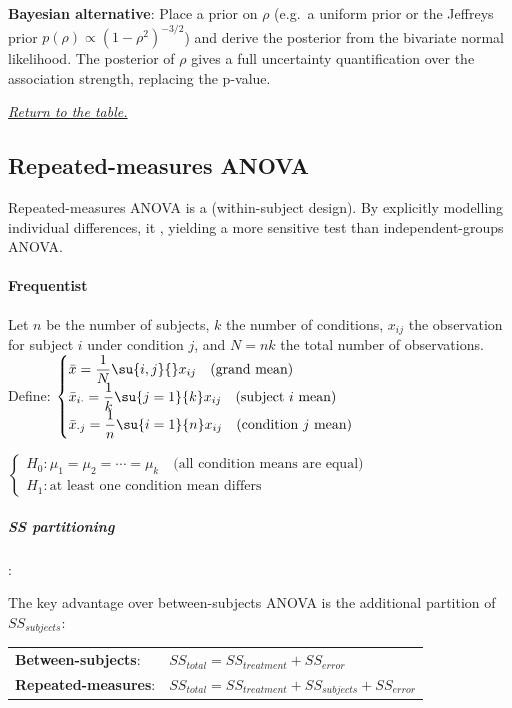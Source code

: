\textbf{Bayesian alternative}: Place a prior on $\rho$ (e.g.\ a uniform prior or the
Jeffreys prior $p(\rho) \propto (1-\rho^2)^{-3/2}$) and derive the posterior from the
bivariate normal likelihood. The posterior of $\rho$ gives a full uncertainty
quantification over the association strength, replacing the p-value.

\textit{\hyperref[statistical_method_table]{Return to the table.}}

\subsection{Repeated-measures ANOVA}

Repeated-measures ANOVA is a  (within-subject design). By
explicitly modelling individual differences, it , yielding a more sensitive test than independent-groups ANOVA.

\paragraph{Frequentist}

Let $n$ be the number of subjects, $k$ the number of conditions, $x_{ij}$ the observation
for subject $i$ under condition $j$, and $N = nk$ the total number of observations.
Define:
$\begin{cases}
    \bar{x} = \dfrac{1}{N}\su{i,j}{}x_{ij} \quad \text{(grand mean)} \\
    \bar{x}_{i\cdot} = \dfrac{1}{k}\su{j=1}{k}x_{ij} \quad \text{(subject } i \text{ mean)} \\
    \bar{x}_{\cdot j} = \dfrac{1}{n}\su{i=1}{n}x_{ij} \quad \text{(condition } j \text{ mean)}
\end{cases}$

$\begin{cases}
    H_0: \mu_1 = \mu_2 = \cdots = \mu_k \quad \text{(all condition means are equal)} \\
    H_1: \text{at least one condition mean differs}
\end{cases}$

\subparagraph{SS partitioning}:

The key advantage over between-subjects ANOVA is the additional partition of $SS_{subjects}$:

\begin{center}
\begin{tabular}{ll}
    \textbf{Between-subjects}: & $SS_{total} = SS_{treatment} + SS_{error}$ \\[4pt]
    \textbf{Repeated-measures}: & $SS_{total} = SS_{treatment} + SS_{subjects} + SS_{error}$
\end{tabular}
\end{center}

